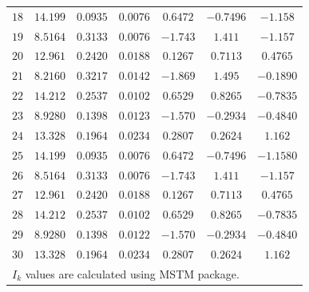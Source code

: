 \documentclass[final, 3p]{elsarticle}
\begin{document}
\begin{table}[h]
\begin{center}
\begin{tabular}{|c|c|c|c|c|c|c|}
$18$ & $14.199$ & $0.0935$ & $0.0076$ & $0.6472$ & $-0.7496$ & $-1.158$ \\
$19$ & $8.5164$ & $0.3133$ & $0.0076$ & $-1.743$ & $1.411$ & $-1.157$ \\
$20$ & $12.961$ & $0.2420$ & $0.0188$ & $0.1267$ & $0.7113$ & $0.4765$ \\
$21$ & $8.2160$ & $0.3217$ & $0.0142$ & $-1.869$ & $1.495$ & $-0.1890$ \\
$22$ & $14.212$ & $0.2537$ & $0.0102$ & $0.6529$ & $0.8265$ & $-0.7835$ \\
$23$ & $8.9280$ & $0.1398$ & $0.0123$ & $-1.570$ &	$-0.2934$ & $-0.4840$ \\
$24$ & $13.328$ & $0.1964$ & $0.0234$ & $0.2807$ & $0.2624$ & $1.162$ \\
$25$ & $14.199$ & $0.0935$ & $0.0076$ & $0.6472$ & $-0.7496$ & $-1.1580$ \\
$26$ & $8.5164$ & $0.3133$ & $0.0076$ & $-1.743$	& $1.411$ & $-1.157$ \\
$27$ & $12.961$ & $0.2420$ & $0.0188$ & $0.1267$	& $0.7113$ & $0.4765$ \\
$28$ & $14.212$ & $0.2537$ & $0.0102$ & $0.6529$ & $0.8265$ & $-0.7835$ \\
$29$ & $8.9280$ & $0.1398$ & $0.0122$ & $-1.570$ &	$-0.2934$ & $-0.4840$ \\
$30$ & $13.328$ & $0.1964$ & $0.0234$ & $0.2807$ & $0.2624$ & $1.162$ \\
\hline\hline
\multicolumn{7}{l}{\small *$I_k$ values are calculated using MSTM package.}
\end{tabular}
\end{center}
\end{table}


\end{document}
